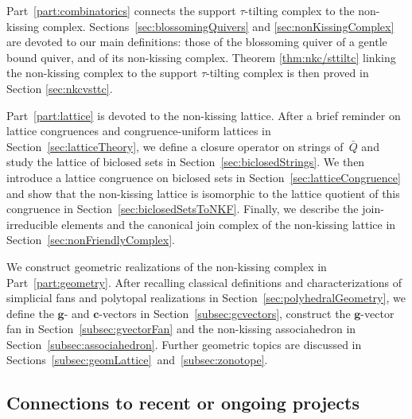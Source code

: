 \documentclass{amsart}
\theoremstyle{definition}
\renewcommand{\b}[1]{\mathbf{#1}} %
\begin{document}
Part~\ref{part:combinatorics} connects the support $\tau$-tilting complex to the non-kissing complex.
Sections~\ref{sec:blossomingQuivers} and \ref{sec:nonKissingComplex} are devoted to our main definitions: those of the blossoming quiver of a gentle bound quiver, and of its non-kissing complex.  
Theorem \ref{thm:nkc/sttiltc} linking the non-kissing complex to the support $\tau$-tilting complex is then proved in Section \ref{sec:nkcvsttc}.

Part~\ref{part:lattice} is devoted to the non-kissing lattice.
After a brief reminder on lattice congruences and congruence-uniform lattices in Section~\ref{sec:latticeTheory}, we define a closure operator on strings of~$\bar Q$ and study the lattice of biclosed sets in Section~\ref{sec:biclosedStrings}.
We then introduce a lattice congruence on biclosed sets in Section~\ref{sec:latticeCongruence} and show that the non-kissing lattice is isomorphic to the lattice quotient of this congruence in Section~\ref{sec:biclosedSetsToNKF}.
Finally, we describe the join-irreducible elements and the canonical join complex of the non-kissing lattice in Section~\ref{sec:nonFriendlyComplex}.

We construct geometric realizations of the non-kissing complex in Part~\ref{part:geometry}.
After recalling classical definitions and characterizations of simplicial fans and polytopal realizations in Section~\ref{sec:polyhedralGeometry}, we define the $\b{g}$- and $\b{c}$-vectors in Section~\ref{subsec:gcvectors}, construct the $\b{g}$-vector fan in Section~\ref{subsec:gvectorFan} and the non-kissing associahedron in Section~\ref{subsec:associahedron}.
Further geometric topics are discussed in Sections~\ref{subsec:geomLattice}~and~\ref{subsec:zonotope}.

\subsection*{Connections to recent or ongoing projects}
\end{document}
